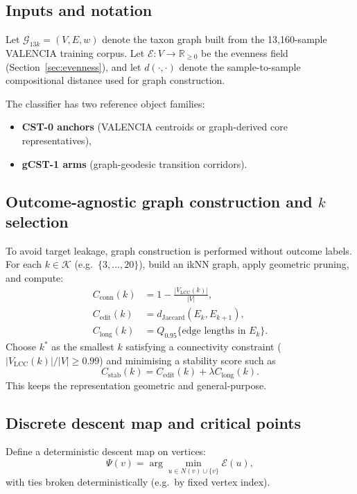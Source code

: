 \documentclass[11pt]{article}
\theoremstyle{plain}
\newcommand{\E}{\mathcal{E}}
\newcommand{\G}{\mathcal{G}}
\newcommand{\R}{\mathbb{R}}
\begin{document}
\subsection{Inputs and notation}

Let $\G_{13k}=(V,E,w)$ denote the taxon graph built from the 13{,}160-sample
VALENCIA training corpus.  Let $\E:V\to\R_{\ge 0}$ be the evenness field
(Section~\ref{sec:evenness}), and let $d(\cdot,\cdot)$ denote the
sample-to-sample compositional distance used for graph construction.

The classifier has two reference object families:
\begin{itemize}[noitemsep]
  \item \textbf{CST-0 anchors} (VALENCIA centroids or graph-derived core
        representatives),
  \item \textbf{gCST-1 arms} (graph-geodesic transition corridors).
\end{itemize}

\subsection{Outcome-agnostic graph construction and $k$ selection}

To avoid target leakage, graph construction is performed without outcome labels.
For each $k \in \mathcal{K}$ (e.g.\ $\{3,\ldots,20\}$), build an ikNN graph,
apply geometric pruning, and compute:
\begin{align*}
  C_{\mathrm{conn}}(k) &= 1 - \frac{|V_{\mathrm{LCC}}(k)|}{|V|},\\
  C_{\mathrm{edit}}(k) &= d_{\mathrm{Jaccard}}(E_k, E_{k+1}),\\
  C_{\mathrm{long}}(k) &= Q_{0.95}\{\text{edge lengths in }E_k\}.
\end{align*}
Choose $k^\ast$ as the smallest $k$ satisfying a connectivity constraint
($|V_{\mathrm{LCC}}(k)|/|V|\ge 0.99$) and minimising a stability score such as
\[
  C_{\mathrm{stab}}(k)=C_{\mathrm{edit}}(k)+\lambda C_{\mathrm{long}}(k).
\]
This keeps the representation geometric and general-purpose.

\subsection{Discrete descent map and critical points}

Define a deterministic descent map on vertices:
\[
  \Psi(v)=\arg\min_{u\in N(v)\cup\{v\}} \E(u),
\]
with ties broken deterministically (e.g.\ by fixed vertex index).
\end{document}

